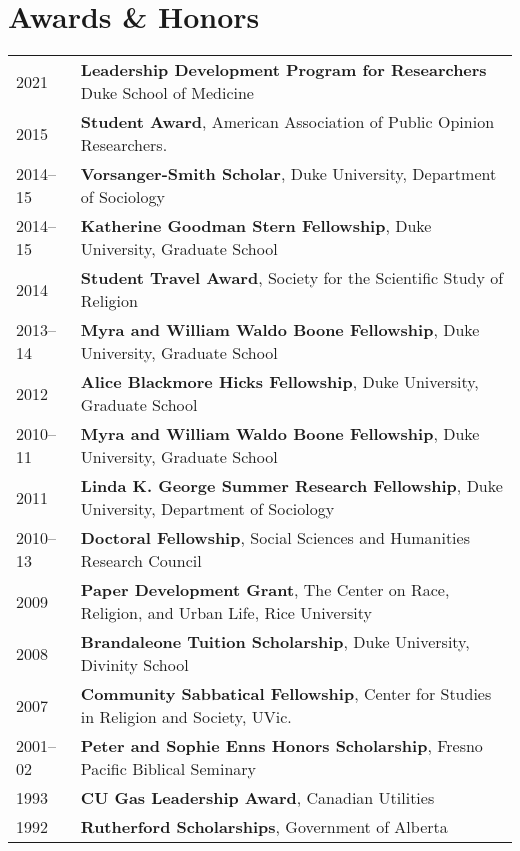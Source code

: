 \nopagebreak
\section*{Awards \& Honors}
\begin{longtable}{p{} p{}}
2021 & \textbf{Leadership Development Program for Researchers} Duke School of Medicine\\
2015 & \textbf{Student Award}, American Association of Public Opinion Researchers.\\
2014--15 & \textbf{Vorsanger-Smith Scholar}, Duke University, Department of Sociology\\
2014--15 & \textbf{Katherine Goodman Stern Fellowship}, Duke University, Graduate School\\
2014 & \textbf{Student Travel Award}, Society for the Scientific Study of Religion\\
2013--14 & \textbf{Myra and William Waldo Boone Fellowship}, Duke University, Graduate School\\
2012 & \textbf{Alice Blackmore Hicks Fellowship}, Duke University, Graduate School\\
2010--11 & \textbf{Myra and William Waldo Boone Fellowship}, Duke University, Graduate School\\
2011 & \textbf{Linda K. George Summer Research Fellowship}, Duke University, Department of Sociology\\
2010--13 & \textbf{Doctoral Fellowship}, Social Sciences and Humanities Research Council\\
2009 & \textbf{Paper Development Grant}, The Center on Race, Religion, and Urban Life, Rice University\\
2008 & \textbf{Brandaleone Tuition Scholarship}, Duke University, Divinity School\\
2007 & \textbf{Community Sabbatical Fellowship}, Center for Studies in Religion and Society, UVic.\\
2001--02 & \textbf{Peter and Sophie Enns Honors Scholarship}, Fresno Pacific Biblical Seminary\\
1993 & \textbf{CU Gas Leadership Award}, Canadian Utilities\\
1992 & \textbf{Rutherford Scholarships}, Government of Alberta\\
\end{longtable}

